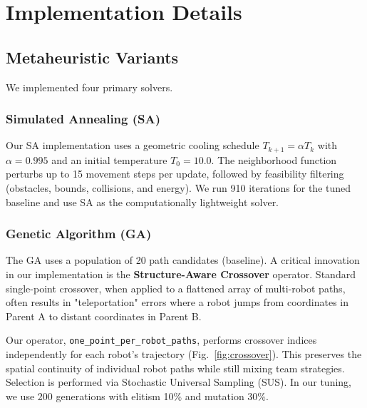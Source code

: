 \documentclass[conference]{IEEEtran}
\begin{document}
\section{Implementation Details}
\label{sec:implementation}


\subsection{Metaheuristic Variants}
We implemented four primary solvers.

\subsubsection{Simulated Annealing (SA)}
Our SA implementation uses a geometric cooling schedule $T_{k+1} = \alpha T_k$ with $\alpha=0.995$ and an initial temperature $T_0=10.0$. The neighborhood function perturbs up to 15 movement steps per update, followed by feasibility filtering (obstacles, bounds, collisions, and energy). We run 910 iterations for the tuned baseline and use SA as the computationally lightweight solver.

\subsubsection{Genetic Algorithm (GA)}
The GA uses a population of 20 path candidates (baseline). A critical innovation in our implementation is the \textbf{Structure-Aware Crossover} operator. Standard single-point crossover, when applied to a flattened array of multi-robot paths, often results in "teleportation" errors where a robot jumps from coordinates in Parent A to distant coordinates in Parent B.

Our operator, \texttt{one\_point\_per\_robot\_paths}, performs crossover indices independently for each robot's trajectory (Fig.~\ref{fig:crossover}). This preserves the spatial continuity of individual robot paths while still mixing team strategies. Selection is performed via Stochastic Universal Sampling (SUS). In our tuning, we use 200 generations with elitism 10\% and mutation 30\%.

\FloatBarrier
\end{document}
